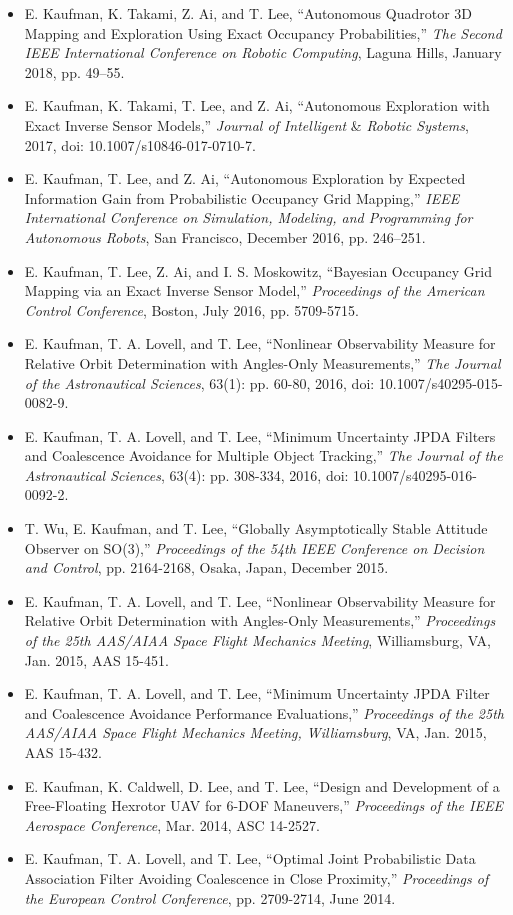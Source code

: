 \begin{itemize}
	\item E. Kaufman, K. Takami, Z. Ai, and T. Lee, ``Autonomous Quadrotor 3D Mapping and Exploration Using Exact Occupancy Probabilities,'' \textit{The Second IEEE International Conference on Robotic Computing}, Laguna Hills, January 2018, pp. 49--55.
	\item E. Kaufman, K. Takami, T. Lee, and Z. Ai, ``Autonomous Exploration with Exact Inverse Sensor Models,'' \textit{Journal of Intelligent }\&\textit{ Robotic Systems}, 2017, doi: 10.1007/s10846-017-0710-7.
	\item E. Kaufman, T. Lee, and Z. Ai, ``Autonomous Exploration by Expected Information Gain from Probabilistic Occupancy Grid Mapping,'' \textit{IEEE International Conference on Simulation, Modeling, and Programming for Autonomous Robots}, San Francisco, December 2016, pp. 246--251.
	\item E. Kaufman, T. Lee, Z. Ai, and I. S. Moskowitz, ``Bayesian Occupancy Grid Mapping via an Exact Inverse Sensor Model,'' \textit{Proceedings of the American Control Conference}, Boston, July 2016, pp. 5709-5715.
	\item E. Kaufman, T. A. Lovell, and T. Lee, ``Nonlinear Observability Measure for Relative Orbit Determination with Angles-Only Measurements,'' \textit{The Journal of the Astronautical Sciences}, 63(1): pp. 60-80, 2016, doi: 10.1007/s40295-015-0082-9.
	\item E. Kaufman, T. A. Lovell, and T. Lee, ``Minimum Uncertainty JPDA Filters and Coalescence Avoidance for Multiple Object Tracking,'' \textit{The Journal of the Astronautical Sciences}, 63(4): pp. 308-334, 2016, doi: 10.1007/s40295-016-0092-2.
	\item T. Wu, E. Kaufman, and T. Lee, ``Globally Asymptotically Stable Attitude Observer on SO(3),'' \textit{Proceedings of the 54th IEEE Conference on Decision and Control}, pp. 2164-2168, Osaka, Japan, December 2015.
	\item E. Kaufman, T. A. Lovell, and T. Lee, ``Nonlinear Observability Measure for Relative Orbit Determination with Angles-Only Measurements,'' \textit{Proceedings of the 25th AAS/AIAA Space Flight Mechanics Meeting}, Williamsburg, VA, Jan. 2015, AAS 15-451.
	\item E. Kaufman, T. A. Lovell, and T. Lee, ``Minimum Uncertainty JPDA Filter and Coalescence Avoidance Performance Evaluations,'' \textit{Proceedings of the 25th AAS/AIAA Space Flight Mechanics Meeting, Williamsburg}, VA, Jan. 2015, AAS 15-432.
	\item E. Kaufman, K. Caldwell, D. Lee, and T. Lee, ``Design and Development of a Free-Floating Hexrotor UAV for 6-DOF Maneuvers,'' \textit{Proceedings of the IEEE Aerospace Conference}, Mar. 2014, ASC 14-2527.
	\item E. Kaufman, T. A. Lovell, and T. Lee, ``Optimal Joint Probabilistic Data Association Filter Avoiding Coalescence in Close Proximity,'' \textit{Proceedings of the European Control Conference}, pp. 2709-2714, June 2014.
	\vspace*{0.5cm}
\end{itemize}







